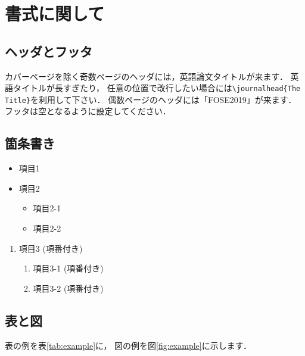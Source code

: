 \documentclass{fose2019}           %
\begin{document}
\section{書式に関して}
\subsection{ヘッダとフッタ}
カバーページを除く奇数ページのヘッダには，英語論文タイトルが来ます．
英語タイトルが長すぎたり，
任意の位置で改行したい場合には\verb|\journalhead{The Title}|を利用して下さい．
偶数ページのヘッダには「FOSE2019」が来ます．
フッタは空となるように設定してください．

\subsection{箇条書き}
\begin{itemize}
\item 項目1
\item 項目2
  \begin{itemize}
  \item 項目2-1
  \item 項目2-2
  \end{itemize}
\end{itemize}

\begin{enumerate}
\item 項目3 (項番付き)
  \begin{enumerate}
  \item 項目3-1 (項番付き)
  \item 項目3-2 (項番付き)
  \end{enumerate}
\end{enumerate}

\subsection{表と図}

表の例を表\ref{tab:example}に，
図の例を図\ref{fig:example}に示します．
\end{document}
